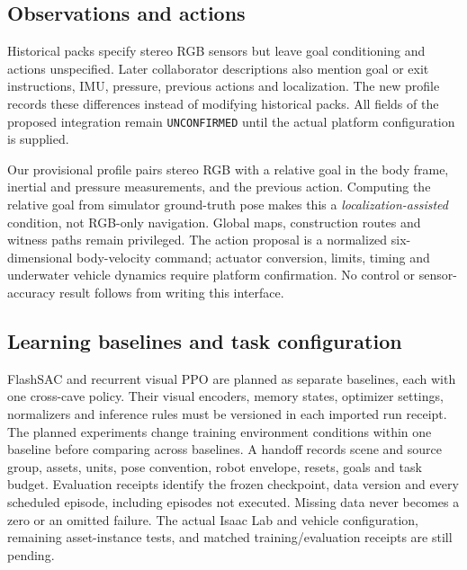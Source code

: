 \subsection{Observations and actions}
Historical packs specify stereo RGB sensors but leave goal conditioning and
actions unspecified. Later collaborator descriptions also mention goal or
exit instructions, IMU, pressure, previous actions and localization. The
new profile records these differences instead of modifying historical packs.
All fields of the proposed integration remain \texttt{UNCONFIRMED} until
the actual platform configuration is supplied.

Our provisional profile pairs stereo RGB with a relative goal in the body
frame, inertial and pressure measurements, and the previous action. Computing
the relative goal from simulator ground-truth pose makes this a
\emph{localization-assisted} condition, not RGB-only navigation. Global maps,
construction routes and witness paths remain privileged. The action proposal
is a normalized six-dimensional body-velocity command; actuator conversion,
limits, timing and underwater vehicle dynamics require platform confirmation.
No control or sensor-accuracy result follows from writing this interface.

\subsection{Learning baselines and task configuration}
FlashSAC and recurrent visual PPO are planned as separate baselines, each with
one cross-cave policy. Their visual encoders, memory states, optimizer settings,
normalizers and inference rules must be versioned in each imported run receipt.
The planned experiments change training
environment conditions within one baseline before comparing across baselines.
A handoff records scene and source group, assets, units, pose convention,
robot envelope, resets, goals and task budget. Evaluation receipts identify
the frozen checkpoint, data version and every scheduled episode, including
episodes not executed. Missing data never becomes a zero or an omitted failure.
The actual Isaac Lab and vehicle configuration, remaining asset-instance tests,
and matched training/evaluation receipts are still pending.
